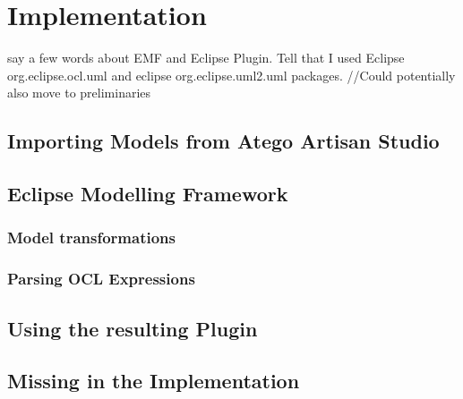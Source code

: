 \section{Implementation}
say a few words about EMF and Eclipse Plugin. Tell that I used Eclipse org.eclipse.ocl.uml and eclipse org.eclipse.uml2.uml packages. //Could potentially also move to preliminaries
\subsection{Importing Models from Atego Artisan Studio}
\subsection{Eclipse Modelling Framework}
\subsubsection{Model transformations}
\subsubsection{Parsing OCL Expressions}
\subsection{Using the resulting Plugin}
\subsection{Missing in the Implementation}
